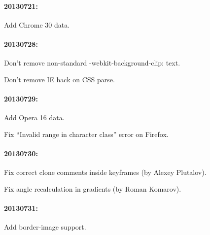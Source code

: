 \paragraph*{20130721\+:}


\begin{DoxyItemize}
\item Add Chrome 30 data.
\end{DoxyItemize}

\paragraph*{20130728\+:}


\begin{DoxyItemize}
\item Don’t remove non-\/standard -\/webkit-\/background-\/clip\+: text.
\item Don’t remove IE hack on C\+SS parse.
\end{DoxyItemize}

\paragraph*{20130729\+:}


\begin{DoxyItemize}
\item Add Opera 16 data.
\item Fix “\+Invalid range in character class” error on Firefox.
\end{DoxyItemize}

\paragraph*{20130730\+:}


\begin{DoxyItemize}
\item Fix correct clone comments inside keyframes (by Alexey Plutalov).
\item Fix angle recalculation in gradients (by Roman Komarov).
\end{DoxyItemize}

\paragraph*{20130731\+:}


\begin{DoxyItemize}
\item Add border-\/image support.
\end{DoxyItemize}

